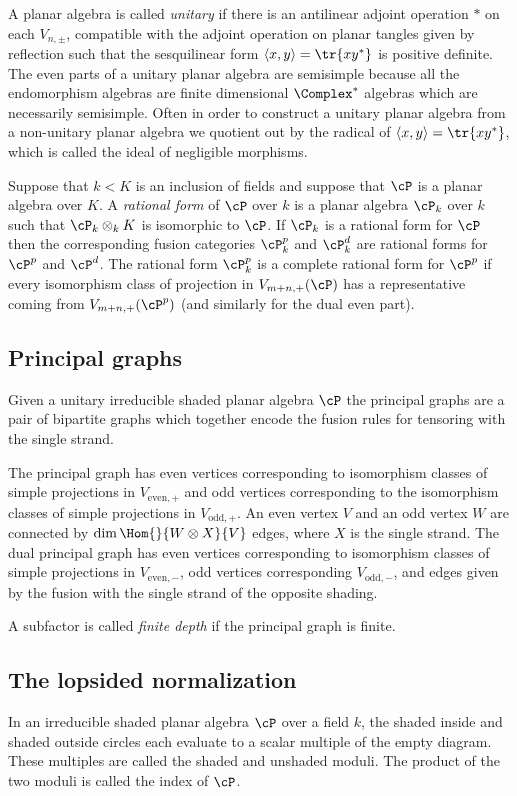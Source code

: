 A planar algebra is called \emph{unitary} if there is an antilinear adjoint operation $*$ on each $V_{n,\pm}$, compatible with the adjoint operation on planar tangles given by reflection such that the sesquilinear form $\langle x,y \rangle = \tr{x y^*}$ is positive definite.  The even parts of a unitary planar algebra are semisimple because all the endomorphism algebras are finite dimensional $\Complex^*$ algebras which are necessarily semisimple.  Often in order to construct a unitary planar algebra from a non-unitary planar algebra we quotient out by the radical of $\langle x,y \rangle = \tr{x y^*}$, which is called the ideal of negligible morphisms.

Suppose that $k<K$ is an inclusion of fields and suppose that $\cP$ is a planar algebra over $K$.  A \emph{rational form} of $\cP$ over $k$ is a planar algebra $\cP_k$ over $k$ such that $\cP_k \otimes_k K$ is isomorphic to $\cP$.  If $\cP_k$ is a rational form for $\cP$ then the corresponding fusion categories $\cP_k^p$ and $\cP_k^d$ are rational forms for $\cP^p$ and $\cP^d$.  The rational form $\cP_k^p$ is a complete rational form for $\cP^p$ if every isomorphism class of projection in $V_{m+n,+}(\cP)$ has a representative coming from $V_{m+n,+}(\cP^p)$ (and similarly for the dual even part).

\subsection{Principal graphs}

Given a unitary irreducible shaded planar algebra $\cP$ the principal graphs are a pair of bipartite graphs which together encode the fusion rules for tensoring with the single strand.

The principal graph has even vertices corresponding to isomorphism classes of simple projections in $V_{\text{even},+}$ and odd vertices corresponding to the isomorphism classes of simple projections in $V_{\text{odd},+}$.  An even vertex $V$ and an odd vertex $W$ are connected by $\dim \Hom{}{W \otimes X}{V}$ edges, where $X$ is the single strand.  The dual principal graph has even vertices corresponding to isomorphism classes of simple projections in $V_{\text{even},-}$, odd vertices corresponding $V_{\text{odd},-}$, and edges given by the fusion with the single strand of the opposite shading.

A subfactor is called \emph{finite depth} if the principal graph is finite.

\subsection{The lopsided normalization}
\label{sec:lopsided}%
In an irreducible shaded planar algebra $\cP$ over a field $k$, the shaded inside and shaded outside circles each evaluate to a scalar multiple of the empty diagram. These multiples are called the shaded and unshaded moduli. The product of the two moduli is called the index of $\cP$.

